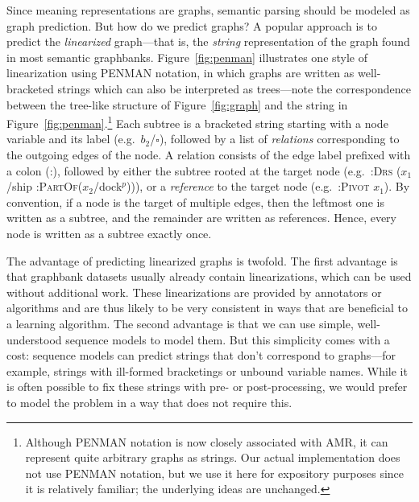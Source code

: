 \documentclass[11pt,a4paper]{article}
\theoremstyle{plain}
\begin{document}
Since meaning representations are graphs, semantic parsing should be
modeled as graph prediction. But how do we predict graphs? A popular
approach is to predict the \emph{linearized} graph---that is, the
\emph{string} representation of the graph found in most semantic
graphbanks. Figure~\ref{fig:penman} illustrates one style of
linearization using PENMAN notation, in which graphs are written as
well-bracketed strings which can also be interpreted as trees---note
the correspondence between the tree-like structure of
Figure~\ref{fig:graph} and the string in
Figure~\ref{fig:penman}.\footnote{Although PENMAN notation is now
  closely associated with AMR, it can represent quite arbitrary graphs
  as strings. Our actual implementation does not use PENMAN notation,
  but we use it here for expository purposes since it is relatively
  familiar; the underlying ideas are unchanged.} Each subtree is a
bracketed string starting with a node variable and its label
(e.g.~$b_2$/$\square$), followed by a list of \emph{relations}
corresponding to the outgoing edges of the node. A relation consists
of the edge label prefixed with a colon (:), followed by either the
subtree rooted at the target node (e.g.~:\textsc{Drs} ($x_1$/ship
:\textsc{PartOf}($x_2$/dock$^p$))), or a \emph{reference} to the
target node (e.g.~:\textsc{Pivot} $x_1$). By convention, if a node is
the target of multiple edges, then the leftmost one is written as a
subtree, and the remainder are written as references. Hence, every node
is written as a subtree exactly once.

The advantage of predicting linearized graphs is twofold. The first advantage is that graphbank datasets usually already contain linearizations, which can be used without additional work. These linearizations are provided by annotators or algorithms and are thus likely to be very consistent in ways that are beneficial to a learning algorithm. The second advantage is that we can use simple, well-understood sequence models \citep{gu2016incorporating,jia2016data,van2018exploring} to model them. But this simplicity comes with a cost: sequence models can predict strings that don't correspond to graphs---for example, strings with ill-formed bracketings or unbound variable names. While it is often possible to fix these strings with pre- or post-processing, we would prefer to model the problem in a way that does not require this.
\end{document}
